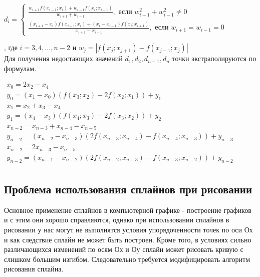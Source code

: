 \begin{center}
	$d_i=
	\begin{cases}
	\frac{w_{i+1}f(x_{i-1};x_i)+w_{i-1}f(x_i;x_{i+1})}{w_{i+1}+w_{i-1}}, \mbox{ если } w_{i+1}^2+w_{i-1}^2 \neq 0\\
	\frac{(x_{i+1}-x_i)f(x_{i-1};x_i)+(x_i-x_{i-1})f(x_i;x_{i+1})}{x_{i+1}-x_{i-1}}, \mbox{ если }  w_{i+1}=w_{i-1}=0
	\end{cases}$
\end{center}
, где $i=3,4,...,n-2$ и $w_j=|f(x_j;x_{j+1})-f(x_{j-1};x_j)|$\\
Для получения недостающих значений $d_1,d_2,d_{n-1},d_n$ точки экстраполируются по формулам.
\begin{center}
	\qquad
	$\begin{array}{l}
	x_0=2x_2-x_4\\
	y_0=(x_1-x_0)(f(x_3;x_2)-2f(x_2;x_1))+y_1\\
	x_1=x_2+x_3-x_4\\
	y_1=(x_4-x_3)(f(x_4;x_3)-2f(x_3;x_2))+y_2\\
	x_{n-2}=x_{n-3}+x_{n-4}-x_{n-5}\\
	y_{n-2}=(x_{n-2}-x_{n-3})(2f(x_{n-3};x_{n-4})-f(x_{n-4};x_{n-3}))+y_{n-3}\\
	x_{n-2}=2x_{n-3}-x_{n-5}\\
	y_{n-2}=(x_{n-1}-x_{n-2})(2f(x_{n-2};x_{n-3})-f(x_{n-3};x_{n-2}))+y_{n-2}\\
	\end{array}$
\end{center}
\subsection{Проблема использования сплайнов при рисовании}
Основное применение сплайнов в компьютерной графике - построение графиков и с этим они хорошо справляются, однако при использовании сплайнов в рисовании у нас могут не выполнятся условия упорядоченности точек по оси Ох и как следствие сплайн не может быть построен. Кроме того, в условиях сильно различающихся изменений по осям Ох и Оу сплайн может рисовать кривую с слишком большим изгибом. Следовательно требуется модифицировать алгоритм рисования сплайна.
